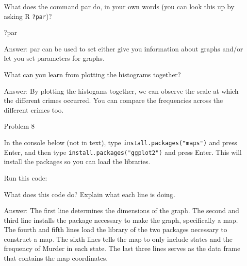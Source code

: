 \documentclass[
]{article}
\newenvironment{Shaded}{\begin{snugshade}}{\end{snugshade}}
\newcommand{\AttributeTok}[1]{\textcolor[rgb]{0.77,0.63,0.00}{#1}}
\newcommand{\FunctionTok}[1]{\textcolor[rgb]{0.00,0.00,0.00}{#1}}
\newcommand{\NormalTok}[1]{#1}
\newcommand{\SpecialCharTok}[1]{\textcolor[rgb]{0.00,0.00,0.00}{#1}}
\newcommand{\StringTok}[1]{\textcolor[rgb]{0.31,0.60,0.02}{#1}}
\begin{document}
What does the command par do, in your own words (you can look this up by
asking R \texttt{?par})?

\begin{Shaded}
\begin{Highlighting}[]
\NormalTok{?par}
\end{Highlighting}
\end{Shaded}

Answer: par can be used to set either give you information about graphs
and/or let you set parameters for graphs.

What can you learn from plotting the histograms together?

Answer: By plotting the histogams together, we can observe the scale at
which the different crimes occurred. You can compare the frequencies
across the different crimes too.

Problem 8

In the console below (not in text), type
\texttt{install.packages("maps")} and press Enter, and then type
\texttt{install.packages("ggplot2")} and press Enter. This will install
the packages so you can load the libraries.

Run this code:

\begin{Shaded}
\end{Shaded}

What does this code do? Explain what each line is doing.

Answer: The first line determines the dimensions of the graph. The
second and third line installs the package necessary to make the graph,
specifically a map. The fourth and fifth lines load the library of the
two packages necessary to construct a map. The sixth lines tells the map
to only include states and the frequency of Murder in each state. The
last three lines serves as the data frame that contains the map
coordinates.
\end{document}
